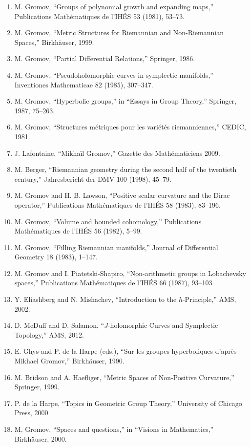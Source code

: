 \begin{enumerate}
\item M. Gromov, ``Groups of polynomial growth and expanding maps,'' Publications Math\'ematiques de l'IH\'ES 53 (1981), 53--73.
\item M. Gromov, ``Metric Structures for Riemannian and Non-Riemannian Spaces,'' Birkh\"auser, 1999.
\item M. Gromov, ``Partial Differential Relations,'' Springer, 1986.
\item M. Gromov, ``Pseudoholomorphic curves in symplectic manifolds,'' Inventiones Mathematicae 82 (1985), 307--347.
\item M. Gromov, ``Hyperbolic groups,'' in ``Essays in Group Theory,'' Springer, 1987, 75--263.
\item M. Gromov, ``Structures m\'etriques pour les vari\'et\'es riemanniennes,'' CEDIC, 1981.
\item J. Lafontaine, ``Mikha\"il Gromov,'' Gazette des Math\'ematiciens 2009.
\item M. Berger, ``Riemannian geometry during the second half of the twentieth century,'' Jahresbericht der DMV 100 (1998), 45--79.
\item M. Gromov and H. B. Lawson, ``Positive scalar curvature and the Dirac operator,'' Publications Math\'ematiques de l'IH\'ES 58 (1983), 83--196.
\item M. Gromov, ``Volume and bounded cohomology,'' Publications Math\'ematiques de l'IH\'ES 56 (1982), 5--99.
\item M. Gromov, ``Filling Riemannian manifolds,'' Journal of Differential Geometry 18 (1983), 1--147.
\item M. Gromov and I. Piatetski-Shapiro, ``Non-arithmetic groups in Lobachevsky spaces,'' Publications Math\'ematiques de l'IH\'ES 66 (1987), 93--103.
\item Y. Eliashberg and N. Mishachev, ``Introduction to the $h$-Principle,'' AMS, 2002.
\item D. McDuff and D. Salamon, ``$J$-holomorphic Curves and Symplectic Topology,'' AMS, 2012.
\item E. Ghys and P. de la Harpe (eds.), ``Sur les groupes hyperboliques d'apr\`es Mikhael Gromov,'' Birkh\"auser, 1990.
\item M. Bridson and A. Haefliger, ``Metric Spaces of Non-Positive Curvature,'' Springer, 1999.
\item P. de la Harpe, ``Topics in Geometric Group Theory,'' University of Chicago Press, 2000.
\item M. Gromov, ``Spaces and questions,'' in ``Visions in Mathematics,'' Birkh\"auser, 2000.

\end{enumerate}
